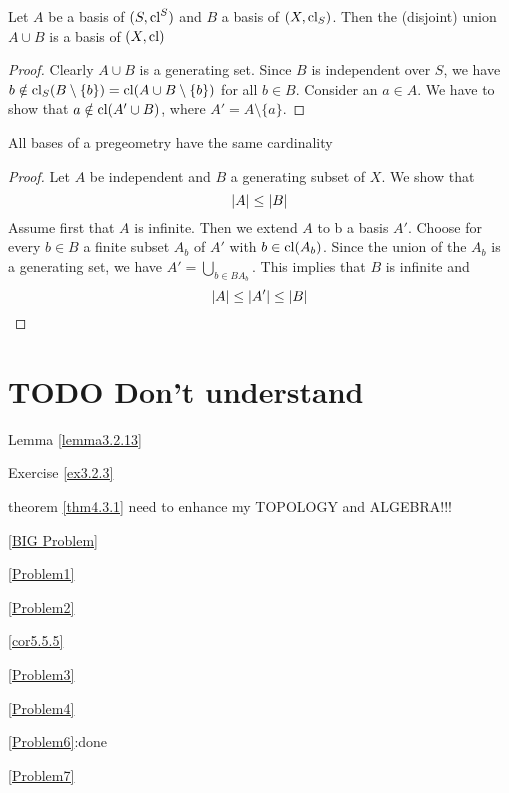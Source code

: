 \documentclass[11pt]{article}
\begin{document}
\begin{remark}
Let \(A\) be a basis of \((S,\operatorname{\text{cl}}^S)\) and \(B\) a basis of \((X,\operatorname{\text{cl}}_S)\). Then the (disjoint)
union \(A\cup B\) is a basis of \((X,\operatorname{\text{cl}})\)
\end{remark}

\begin{proof}
Clearly \(A\cup B\) is a generating set. Since \(B\) is independent over \(S\), we
have \(b\notin\operatorname{\text{cl}}_S(B\setminus\{b\})=\operatorname{\text{cl}}(A\cup B\setminus\{b\})\) for all \(b\in B\). Consider an \(a\in A\). We have to show
that \(a\notin\operatorname{\text{cl}}(A'\cup B)\), where \(A'=A\setminus\{a\}\).
\end{proof}

\begin{lemma}[]
All bases of a pregeometry have the same cardinality
\end{lemma}

\begin{proof}
Let \(A\) be independent and \(B\) a generating subset of \(X\). We show that
\begin{equation*}
\abs{A}\le\abs{B}
\end{equation*}
Assume first that \(A\) is infinite. Then we extend \(A\) to b a basis \(A'\). Choose for
every \(b\in B\) a finite subset \(A_b\) of \(A'\) with \(b\in\operatorname{\text{cl}}(A_b)\). Since the union of
the \(A_b\) is a generating set, we have \(A'=\bigcup_{b\in BA_b}\). This implies that \(B\) is infinite
and
\begin{equation*}
\abs{A}\le\abs{A'}\le\abs{B}
\end{equation*}
\end{proof}
\section{{\bfseries\sffamily TODO} Don't understand}
\label{sec:org553be75}
Lemma \ref{lemma3.2.13}

Exercise \ref{ex3.2.3}

theorem \ref{thm4.3.1} need to enhance my TOPOLOGY and ALGEBRA!!!

\ref{BIG Problem}

\ref{Problem1}

\ref{Problem2}

\ref{cor5.5.5}

\ref{Problem3}

\ref{Problem4}



\ref{Problem6}:done

\ref{Problem7}
\end{document}

